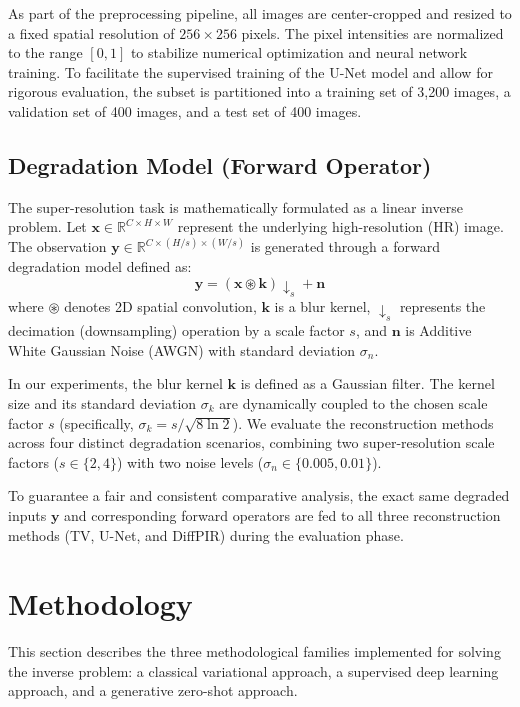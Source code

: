 \documentclass[10pt,journal,compsoc]{IEEEtran}
\begin{document}
As part of the preprocessing pipeline, all images are center-cropped and resized to a fixed spatial resolution of $256 \times 256$ pixels. The pixel intensities are normalized to the range $[0, 1]$ to stabilize numerical optimization and neural network training. To facilitate the supervised training of the U-Net model and allow for rigorous evaluation, the subset is partitioned into a training set of 3,200 images, a validation set of 400 images, and a test set of 400 images.

\subsection{Degradation Model (Forward Operator)}
The super-resolution task is mathematically formulated as a linear inverse problem. Let $\mathbf{x} \in \mathbb{R}^{C \times H \times W}$ represent the underlying high-resolution (HR) image. The observation $\mathbf{y} \in \mathbb{R}^{C \times (H/s) \times (W/s)}$ is generated through a forward degradation model defined as:
\begin{equation}
    \mathbf{y} = (\mathbf{x} \circledast \mathbf{k})\downarrow_{s} + \mathbf{n}
\end{equation}
where $\circledast$ denotes 2D spatial convolution, $\mathbf{k}$ is a blur kernel, $\downarrow_{s}$ represents the decimation (downsampling) operation by a scale factor $s$, and $\mathbf{n}$ is Additive White Gaussian Noise (AWGN) with standard deviation $\sigma_n$.

In our experiments, the blur kernel $\mathbf{k}$ is defined as a Gaussian filter. The kernel size and its standard deviation $\sigma_k$ are dynamically coupled to the chosen scale factor $s$ (specifically, $\sigma_k = s / \sqrt{8 \ln 2}$). 
We evaluate the reconstruction methods across four distinct degradation scenarios, combining two super-resolution scale factors ($s \in \{2, 4\}$) with two noise levels ($\sigma_n \in \{0.005, 0.01\}$). 

To guarantee a fair and consistent comparative analysis, the exact same degraded inputs $\mathbf{y}$ and corresponding forward operators are fed to all three reconstruction methods (TV, U-Net, and DiffPIR) during the evaluation phase.

\section{Methodology}
This section describes the three methodological families implemented for solving the inverse problem: a classical variational approach, a supervised deep learning approach, and a generative zero-shot approach.
\end{document}
